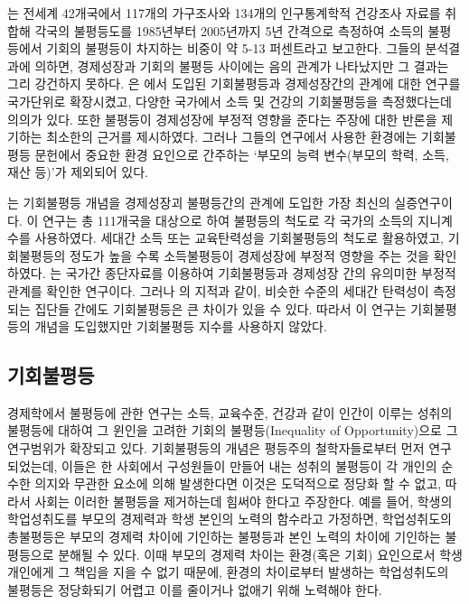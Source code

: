  \cite{fetl18}는 전세계 42개국에서 117개의 가구조사와 134개의 인구통계학적 건강조사 자료를 취합해 각국의 불평등도를 1985년부터 2005년까지 5년 간격으로 측정하여 소득의 불평등에서 기회의 불평등이 차지하는 비중이 약 5-13 퍼센트라고 보고한다.
 그들의 분석결과에 의하면, 경제성장과 기회의 불평등 사이에는 음의 관계가 나타났지만 그 결과는 그리 강건하지 못하다.
\cite{fetl18}은 \cite{mnr13}에서 도입된 기회불평등과 경제성장간의 관계에 대한 연구를 국가단위로 확장시켰고, 다양한 국가에서 소득 및 건강의 기회불평등을 측정했다는데 의의가 있다.
 또한 불평등이 경제성장에 부정적 영향을 준다는 주장에 대한 반론을 제기하는 최소한의 근거를 제시하였다.
 그러나 그들의 연구에서 사용한 환경에는 기회불평등 문헌에서 중요한 환경 요인으로 간주하는 ‘부모의 능력 변수(부모의 학력, 소득, 재산 등)’가 제외되어 있다.
 
\cite{ane20}는 기회불평등 개념을 경제성장괴 불평등간의 관계에 도입한 가장 최신의 실증연구이다.
이 연구는 총 111개국을 대상으로 하여 불평등의 척도로 각 국가의 소득의 지니계수를 사용하였다.
세대간 소득 또는 교육탄력성을 기회불평등의 척도로 활용하였고, 기회불평등의 정도가 높을 수록 소득불평등이 경제성장에 부정적 영향을 주는 것을 확인하였다. 
\cite{ane20}는 국가간 종단자료를 이용하여 기회불평등과 경제성장 간의 유의미한 부정적 관계를 확인한 연구이다.
그러나 \cite{corak13}의 지적과 같이, 비슷한 수준의 세대간 탄력성이 측정되는 집단들 간에도 기회불평등은 큰 차이가 있을 수 있다.
따라서 이 연구는 기회불평등의 개념을 도입했지만 기회불평등 지수를 사용하지 않았다.

\subsection{기회불평등}

경제학에서 불평등에 관한 연구는 소득, 교육수준, 건강과 같이 인간이 이루는 성취의 불평등에 대하여 그 윈인을 고려한 기회의 불평등(Inequality of Opportunity)으로 그 연구범위가 확장되고 있다.
기회불평등의 개념은 평등주의 철학자들로부터 먼저 연구되었는데, 이들은 한 사회에서 구성원들이 만들어 내는 성취의 불평등이 각 개인의 순수한 의지와 무관한 요소에 의해 발생한다면 이것은 도덕적으로 정당화 할 수 없고, 따라서 사회는 이러한 불평등을 제거하는데 힘써야 한다고 주장한다.
예를 들어, 학생의 학업성취도를 부모의 경제력과 학생 본인의 노력의 함수라고 가정하면, 학업성취도의 총불평등은 부모의 경제력 차이에 기인하는 불평등과 본인 노력의 차이에 기인하는 불평등으로 분해될 수 있다.
이때 부모의 경제력 차이는 환경(혹은 기회) 요인으로서 학생 개인에게 그 책임을 지을 수 없기 때문에, 환경의 차이로부터 발생하는 학업성취도의 불평등은 정당화되기 어렵고 이를 줄이거나 없애기 위해 노력해야 한다.

